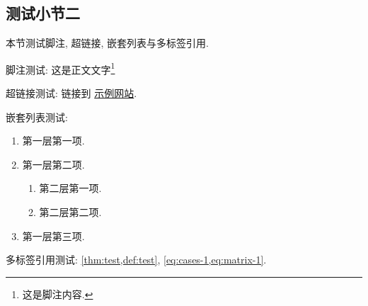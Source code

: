 \subsection{测试小节二}

本节测试脚注, 超链接, 嵌套列表与多标签引用.

脚注测试: 这是正文文字\footnote{这是脚注内容.}

超链接测试: 链接到 \href{https://www.example.com}{示例网站}.

嵌套列表测试:
\begin{enumerate}
    \item 第一层第一项.
    \item 第一层第二项.
    \begin{enumerate}
        \item 第二层第一项.
        \item 第二层第二项.
    \end{enumerate}
    \item 第一层第三项.
\end{enumerate}

多标签引用测试: \cref{thm:test,def:test}, \cref{eq:cases-1,eq:matrix-1}.
